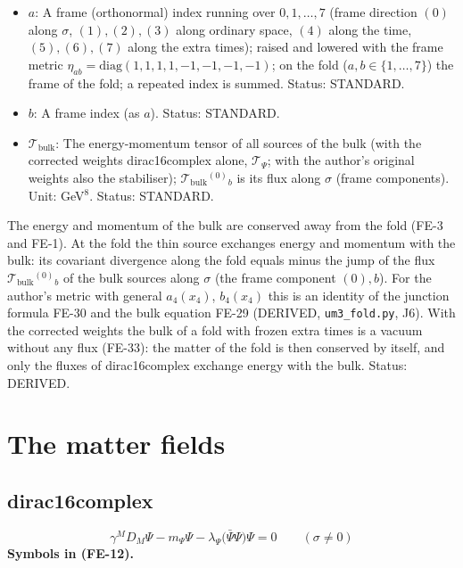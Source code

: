 \documentclass[
  10pt,
]{article}
\begin{document}
\begin{itemize}
  block. Status: DERIVED.
\item
  \(a\): A frame (orthonormal) index running over \(0, 1, \dots, 7\)
  (frame direction \((0)\) along \(\sigma\), \((1), (2), (3)\) along
  ordinary space, \((4)\) along the time, \((5), (6), (7)\) along the
  extra times); raised and lowered with the frame metric
  \(\eta_{ab} = \mathrm{diag}(1, 1, 1, 1, -1, -1, -1, -1)\); on the fold
  (\(a, b \in \{1, \dots, 7\}\)) the frame of the fold; a repeated index
  is summed. Status: STANDARD.
\item
  \(b\): A frame index (as \(a\)). Status: STANDARD.
\item
  \(\mathcal{T}_{\mathrm{bulk}}\): The energy-momentum tensor of all
  sources of the bulk (with the corrected weights dirac16complex alone,
  \(\mathcal{T}_\Psi\); with the author's original weights also the
  stabiliser); \(\mathcal{T}_{\mathrm{bulk}}{}^{(0)}{}_b\) is its flux
  along \(\sigma\) (frame components). Unit: GeV\(^8\). Status:
  STANDARD.
\end{itemize}

The energy and momentum of the bulk are conserved away from the fold
(FE-3 and FE-1). At the fold the thin source exchanges energy and
momentum with the bulk: its covariant divergence along the fold equals
minus the jump of the flux \(\mathcal{T}_{\mathrm{bulk}}{}^{(0)}{}_b\)
of the bulk sources along \(\sigma\) (the frame component \((0), b\)).
For the author's metric with general \(a_4(x_4)\), \(b_4(x_4)\) this is
an identity of the junction formula FE-30 and the bulk equation FE-29
(DERIVED, \texttt{um3\_fold.py}, J6). With the corrected weights the
bulk of a fold with frozen extra times is a vacuum without any flux
(FE-33): the matter of the fold is then conserved by itself, and only
the fluxes of dirac16complex exchange energy with the bulk. Status:
DERIVED.

\hypertarget{the-matter-fields}{%
\section{The matter fields}\label{the-matter-fields}}

\hypertarget{dirac16complex}{%
\subsection{dirac16complex}\label{dirac16complex}}

\[
\gamma^MD_M\Psi - m_\Psi\Psi - \lambda_\Psi\big(\bar\Psi\Psi\big)\Psi = 0\qquad (\sigma \ne 0) \tag{FE-12}
\] \textbf{Symbols in (FE-12).}
\end{document}
